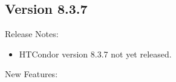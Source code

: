 \subsection*{\label{sec:New-8-3-7}Version 8.3.7}

\noindent Release Notes:

\begin{itemize}

\item HTCondor version 8.3.7 not yet released.

\end{itemize}


\noindent New Features:

